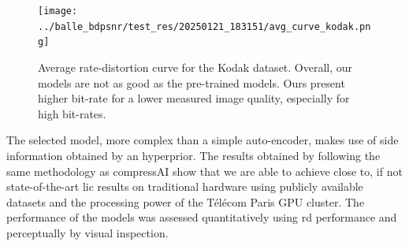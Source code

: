 \begin{figure}
    \centering
    \texttt{[image: ../balle\_bdpsnr/test\_res/20250121\_183151/avg\_curve\_kodak.png]}
    \caption{Average rate-distortion curve for the Kodak dataset. Overall, our models are not as good as the pre-trained models. Ours present higher bit-rate for a lower measured image quality, especially for high bit-rates.}
    \label{bdpsnr_3}
\end{figure}

The selected model, more complex than a simple auto-encoder, makes use of side information obtained by an hyperprior. The results obtained by following the same methodology as compressAI show that we are able to achieve close to, if not state-of-the-art \acrshort{lic} results on traditional hardware using publicly available datasets and the processing power of the Télécom Paris GPU cluster. The performance of the models was assessed quantitatively using \acrshort{rd} performance and perceptually by visual inspection.
